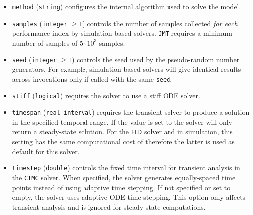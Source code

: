 \begin{itemize}

\item \texttt{method} (\texttt{string}) configures the internal algorithm used to solve the model.

\item \texttt{samples} (\texttt{integer} $\geq 1$) controls the number of samples collected {\em for each} performance index by simulation-based solvers. \texttt{JMT} requires a minimum number of samples of $5\cdot 10^3$ samples.

\item \texttt{seed} (\texttt{integer} $\geq 1$) controls the seed used by the pseudo-random number generators. For example, simulation-based solvers will give identical results across invocations only if called with the same \texttt{seed}.

\item \texttt{stiff} (\texttt{logical}) requires the solver to use a stiff ODE solver.

\item \texttt{timespan} (\texttt{real interval}) requires the transient solver to produce a solution in the specified temporal range. If the value is set to  the solver will only return a steady-state solution. For the \texttt{FLD} solver and in simulation, this setting has the same computational cost of    therefore the latter is used as default for this solver.

\item \texttt{timestep} (\texttt{double}) controls the fixed time interval for transient analysis in the \texttt{CTMC} solver. When specified, the solver generates equally-spaced time points instead of using adaptive time stepping. If not specified or set to empty, the solver uses adaptive ODE time stepping. This option only affects transient analysis and is ignored for steady-state computations.


\end{itemize}
